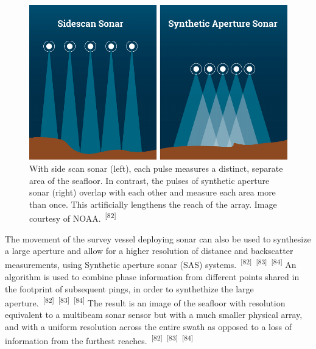 \documentclass{article}
\begin{document}

\begin{figure}
    \centering
    \includegraphics[width=1.0\linewidth]{images/sidescan-vs-sas.png}
    \caption{With side scan sonar (left), each pulse measures a distinct, separate area of the seafloor. In contrast, the pulses of synthetic aperture sonar (right) overlap with each other and measure each area more than once. This artificially lengthens the reach of the array. Image courtesy of NOAA.~\textsuperscript{[82]}}
    \label{figure23}
\end{figure}

\par{The movement of the survey vessel deploying sonar can also be used to synthesize a large aperture and allow for a higher resolution of distance and backscatter measurements, using Synthetic aperture sonar (SAS) systems.~\textsuperscript{[82]}~\textsuperscript{[83]}~\textsuperscript{[84]} An algorithm is used to combine phase information from different points shared in the footprint of subsequent pings, in order to synthethize the large aperture.~\textsuperscript{[82]}~\textsuperscript{[83]}~\textsuperscript{[84]} The result is an image of the seafloor with resolution equivalent to a multibeam sonar sensor but with a much smaller physical array, and with a uniform resolution across the entire swath as opposed to a loss of information from the furthest reaches.~\textsuperscript{[82]}~\textsuperscript{[83]}~\textsuperscript{[84]}}

\end{document}
